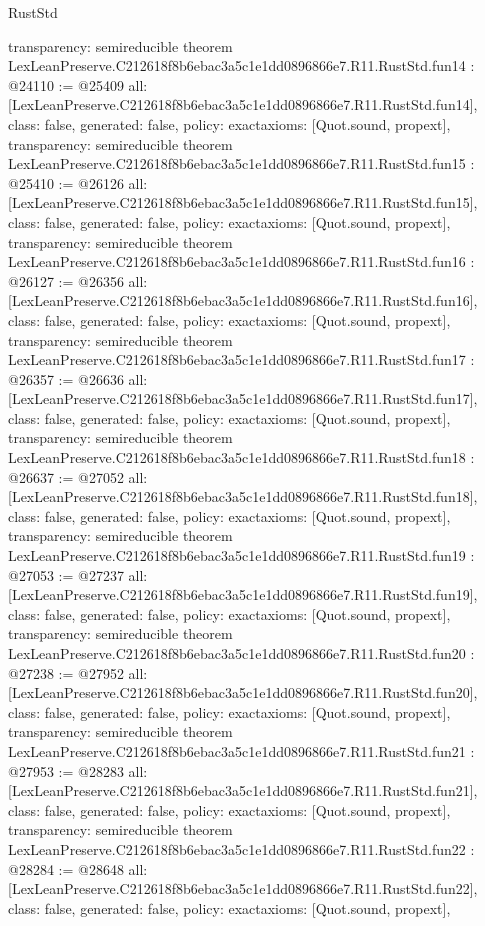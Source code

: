\begin{lexlean}{RustStd}
\begin{coremodule}
{  transparency: semireducible
}
theorem LexLeanPreserve.C212618f8b6ebac3a5c1e1dd0896866e7.R11.RustStd.fun14 : @24110 := @25409 {
  all: [LexLeanPreserve.C212618f8b6ebac3a5c1e1dd0896866e7.R11.RustStd.fun14],
  class: false,
  generated: false,
  policy: exact{axioms: [Quot.sound, propext]},
  transparency: semireducible
}
theorem LexLeanPreserve.C212618f8b6ebac3a5c1e1dd0896866e7.R11.RustStd.fun15 : @25410 := @26126 {
  all: [LexLeanPreserve.C212618f8b6ebac3a5c1e1dd0896866e7.R11.RustStd.fun15],
  class: false,
  generated: false,
  policy: exact{axioms: [Quot.sound, propext]},
  transparency: semireducible
}
theorem LexLeanPreserve.C212618f8b6ebac3a5c1e1dd0896866e7.R11.RustStd.fun16 : @26127 := @26356 {
  all: [LexLeanPreserve.C212618f8b6ebac3a5c1e1dd0896866e7.R11.RustStd.fun16],
  class: false,
  generated: false,
  policy: exact{axioms: [Quot.sound, propext]},
  transparency: semireducible
}
theorem LexLeanPreserve.C212618f8b6ebac3a5c1e1dd0896866e7.R11.RustStd.fun17 : @26357 := @26636 {
  all: [LexLeanPreserve.C212618f8b6ebac3a5c1e1dd0896866e7.R11.RustStd.fun17],
  class: false,
  generated: false,
  policy: exact{axioms: [Quot.sound, propext]},
  transparency: semireducible
}
theorem LexLeanPreserve.C212618f8b6ebac3a5c1e1dd0896866e7.R11.RustStd.fun18 : @26637 := @27052 {
  all: [LexLeanPreserve.C212618f8b6ebac3a5c1e1dd0896866e7.R11.RustStd.fun18],
  class: false,
  generated: false,
  policy: exact{axioms: [Quot.sound, propext]},
  transparency: semireducible
}
theorem LexLeanPreserve.C212618f8b6ebac3a5c1e1dd0896866e7.R11.RustStd.fun19 : @27053 := @27237 {
  all: [LexLeanPreserve.C212618f8b6ebac3a5c1e1dd0896866e7.R11.RustStd.fun19],
  class: false,
  generated: false,
  policy: exact{axioms: [Quot.sound, propext]},
  transparency: semireducible
}
theorem LexLeanPreserve.C212618f8b6ebac3a5c1e1dd0896866e7.R11.RustStd.fun20 : @27238 := @27952 {
  all: [LexLeanPreserve.C212618f8b6ebac3a5c1e1dd0896866e7.R11.RustStd.fun20],
  class: false,
  generated: false,
  policy: exact{axioms: [Quot.sound, propext]},
  transparency: semireducible
}
theorem LexLeanPreserve.C212618f8b6ebac3a5c1e1dd0896866e7.R11.RustStd.fun21 : @27953 := @28283 {
  all: [LexLeanPreserve.C212618f8b6ebac3a5c1e1dd0896866e7.R11.RustStd.fun21],
  class: false,
  generated: false,
  policy: exact{axioms: [Quot.sound, propext]},
  transparency: semireducible
}
theorem LexLeanPreserve.C212618f8b6ebac3a5c1e1dd0896866e7.R11.RustStd.fun22 : @28284 := @28648 {
  all: [LexLeanPreserve.C212618f8b6ebac3a5c1e1dd0896866e7.R11.RustStd.fun22],
  class: false,
  generated: false,
  policy: exact{axioms: [Quot.sound, propext]},
}
\end{coremodule}
\end{lexlean}

